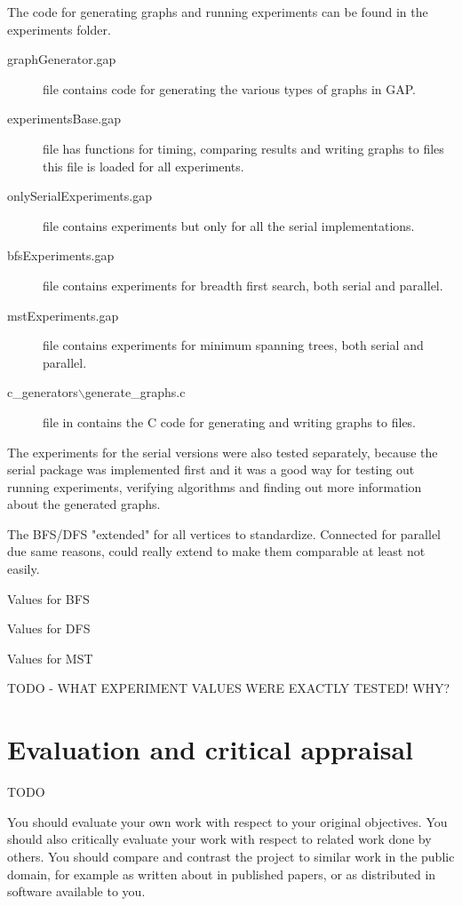\documentclass{report}
\theoremstyle{plain}
\theoremstyle{definition}
\theoremstyle{remark}
\begin{document}
The code for generating graphs and running experiments can be found in the experiments folder.
\begin{description}
\item[graphGenerator.gap] file contains code for generating the various types of graphs in GAP.
\item[experimentsBase.gap] file has functions for timing, comparing results and writing graphs to files this file is loaded for all experiments.
\item[onlySerialExperiments.gap] file contains experiments but only for all the serial implementations.
\item[bfsExperiments.gap] file contains experiments for breadth first search, both serial and parallel.
\item[mstExperiments.gap] file contains experiments for minimum spanning trees, both serial and parallel.
\item[c\_generators$\backslash$generate\_graphs.c] file in contains the C code for generating and writing graphs to files.
\end{description}

The experiments for the serial versions were also tested separately, because the serial package was implemented first and it was a good way for testing out running experiments, verifying algorithms and finding out more information about the generated graphs.

The BFS/DFS "extended" for all vertices to standardize. Connected for parallel due same reasons, could really extend to make them comparable at least not easily.

Values for BFS

Values for DFS

Values for MST

TODO - WHAT EXPERIMENT VALUES WERE EXACTLY TESTED! WHY?

\chapter{Evaluation and critical appraisal}

TODO

You should evaluate your own work with respect to your original
objectives. You should also critically evaluate your work with respect to
related work done by others. You should compare and contrast the project
to similar work in the public domain, for example as written about in
published papers, or as distributed in software available to you.
\end{document}
